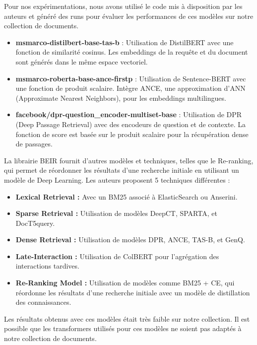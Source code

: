 \documentclass[a4paper, 12pt]{article}
\begin{document}
Pour nos expérimentations, nous avons utilisé le code mis à disposition par les auteurs et généré des runs pour évaluer les performances de ces modèles sur notre collection de documents.
\begin{itemize}
    \item \textbf{msmarco-distilbert-base-tas-b} : Utilisation de DistilBERT avec une fonction de similarité cosinus. Les embeddings de la requête et du document sont générés dans le même espace vectoriel.
    \item \textbf{msmarco-roberta-base-ance-firstp} : Utilisation de Sentence-BERT avec une fonction de produit scalaire. Intègre ANCE, une approximation d'ANN (Approximate Nearest Neighbors), pour les embeddings multilingues.
    \item \textbf{facebook/dpr-question\_encoder-multiset-base} : Utilisation de DPR (Deep Passage Retrieval) avec des encodeurs de question et de contexte. La fonction de score est basée sur le produit scalaire pour la récupération dense de passages. \\
\end{itemize}


La librairie BEIR fournit d'autres modèles et techniques, telles que le Re-ranking, qui permet de réordonner les résultats d'une recherche initiale en utilisant un modèle de Deep Learning. Les auteurs proposent 5 techniques différentes : \\
\begin{itemize}
    \item \textbf{Lexical Retrieval :} Avec un BM25 associé à ElasticSearch ou Anserini.
    \item \textbf{Sparse Retrieval :} Utilisation de modèles DeepCT, SPARTA, et DocT5query.
    \item \textbf{Dense Retrieval :} Utilisation de modèles DPR, ANCE, TAS-B, et GenQ.
    \item \textbf{Late-Interaction :} Utilisation de ColBERT pour l'agrégation des interactions tardives.
    \item \textbf{Re-Ranking Model :} Utilisation de modèles comme BM25 + CE, qui réordonne les résultats d'une recherche initiale avec un modèle de distillation des connaissances. \\
\end{itemize}

Les résultats obtenus avec ces modèles était très faible sur notre collection. Il est possible que les transformers utilisés pour ces modèles ne soient pas adaptés à notre collection de documents. 
\end{document}
